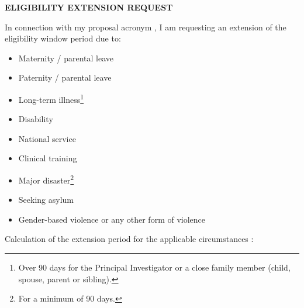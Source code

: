 \documentclass[12pt,a4paper]{article}
\begin{document}
\begin{center}
\textbf{ELIGIBILITY EXTENSION REQUEST}
\end{center}


In connection with my  proposal
acronym , I am requesting an extension of the eligibility
window period due to:

\begin{itemize} \setlength{\itemsep}{1em}
\item[\checkedbox]
Maternity / parental leave

\item[\checkbox]
Paternity / parental leave

\item[\checkbox]
Long-term illness\footnote{Over 90 days for the Principal Investigator or a close family
member (child, spouse, parent or sibling).}

\item[\checkbox]
Disability

\item[\checkbox]
National service

\item[\checkbox]
Clinical training

\item[\checkbox]
Major disaster\footnote{For a minimum of 90 days.}

\item[\checkbox]
Seeking asylum

\item[\checkbox]
Gender-based violence or any other form of violence\footnotemark[2]
\end{itemize}

\vfill

Calculation of the extension period for the applicable circumstances :
\end{document}
